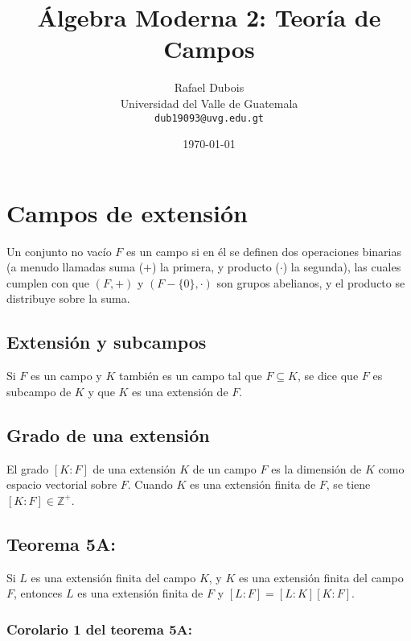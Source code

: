 \documentclass{article}
\title{Álgebra Moderna 2: Teoría de Campos}
\author{\Large Rafael Dubois\\ Universidad del Valle de Guatemala \\ \texttt{dub19093@uvg.edu.gt}}
\date{\today}
\begin{document}
\maketitle
{}
\thispagestyle{fancy}

\section{Campos de extensión}

Un conjunto no vacío $F$ es un campo si en él se definen dos operaciones binarias (a menudo llamadas suma ($+$) la primera, y producto ($\cdot$) la segunda), las cuales cumplen con que $(F,+)$ y $(F-\{0\},\cdot)$ son grupos abelianos, y el producto se distribuye sobre la suma.

\subsection*{\color{violet} Extensión y subcampos}

Si $F$ es un campo y $K$ también es un campo tal que $F\subseteq K$, se dice que $F$ es subcampo de $K$ y que $K$ es una extensión de $F$.

\subsection*{\color{violet} Grado de una extensión}

El grado $[K:F]$ de una extensión $K$ de un campo $F$ es la dimensión de $K$ como espacio vectorial sobre $F$. Cuando $K$ es una extensión finita de $F$, se tiene $[K:F]\in\mathbb{Z}^{+}$.

\subsection*{\color{red} Teorema 5A:}

Si $L$ es una extensión finita del campo $K$, y $K$ es una extensión finita del campo $F$, entonces $L$ es una extensión finita de $F$ y $[L:F]=[L:K][K:F]$.

\subsubsection*{\color{red} Corolario 1 del teorema 5A:}
\end{document}
